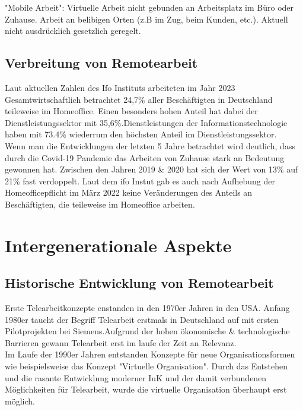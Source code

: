 \documentclass[runningheads]{llncs}
\begin{document}
"Mobile Arbeit": Virtuelle Arbeit nicht gebunden an Arbeitsplatz im Büro oder Zuhause\cite{bundestag}. Arbeit an belibigen Orten (z.B im Zug, beim Kunden, etc.). Aktuell nicht ausdrücklich gesetzlich geregelt\cite{bundestag}.

\subsection{Verbreitung von Remotearbeit}
Laut aktuellen Zahlen des Ifo Instituts arbeiteten im Jahr 2023 Gesamtwirtschaftlich betrachtet 24,7\% aller Beschäftigten in Deutschland teileweise im Homeoffice\cite{ifo23}. Einen besonders hohen Anteil hat dabei der Dienstleistungssektor mit 35,6\%\cite{ifo23}.Dienstleistungen der Informationstechnologie haben mit 73.4\% wiederrum den höchsten Anteil im Dienstleistungssektor\cite{ifo23}.\\
Wenn man die Entwicklungen der letzten 5 Jahre betrachtet wird deutlich, dass durch die Covid-19 Pandemie das Arbeiten von Zuhause stark an Bedeutung gewonnen hat. Zwischen den Jahren 2019 \& 2020 hat sich der Wert von 13\% auf 21\% fast verdoppelt\cite{StatistischesBundesamt}. Laut dem ifo Instut gab es auch nach Aufhebung der Homeofficepflicht im März 2022 keine Veränderungen des Anteils an Beschäftigten, die teileweise im Homeoffice arbeiten\cite{ifo23}.

\section{Intergenerationale Aspekte}

\subsection{Historische Entwicklung von Remotearbeit}
Erste Telearbeitkonzepte enstanden in den 1970er Jahren in den USA\cite{Dangelmaier.1999}. Anfang 1980er taucht der Begriff Telearbeit erstmals in Deutschland auf mit ersten Pilotprojekten bei Siemens\cite{Dangelmaier.1999}.Aufgrund der hohen ökonomische \& technologische Barrieren gewann Telearbeit erst im laufe der Zeit an Relevanz\cite{Dangelmaier.1999}.\\
Im Laufe der 1990er Jahren entstanden Konzepte für neue Organisationsformen wie beispielsweise das Konzept "Virtuelle Organisation"\cite{Siedenbiedel.2020}. Durch das Entstehen und die rasante Entwicklung moderner IuK und der damit verbundenen Möglichkeiten für Telearbeit, wurde die virtuelle Organisation überhaupt erst möglich\cite{Siedenbiedel.2020}.
\end{document}
